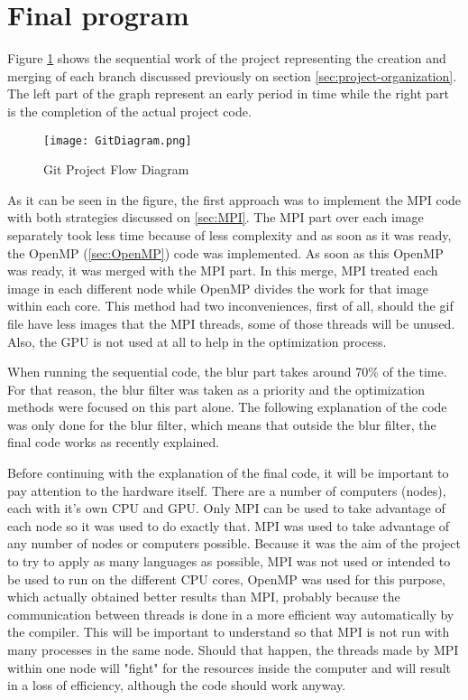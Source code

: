 \documentclass[conference,compsoc]{IEEEtran}
\begin{document}

\section{Final program}

Figure \ref{fig:Git-Project-Flow-Diagram} shows the sequential work of the project representing the creation and merging of each branch discussed previously on section \ref{sec:project-organization}. The left part of the graph represent an early period in time while the right part is the completion of the actual project code.

\begin{figure}[H]
	\texttt{[image: GitDiagram.png]}	\centering
	\caption{Git Project Flow Diagram	\label{fig:Git-Project-Flow-Diagram}}
\end{figure}

As it can be seen in the figure, the first approach was to implement the MPI code with both strategies discussed on \ref{sec:MPI}. The MPI part over each image separately took less time because of less complexity and as soon as it was ready, the OpenMP (\ref{sec:OpenMP}) code was implemented. As soon as this OpenMP was ready, it was merged with the MPI part. In this merge, MPI treated each image in each different node while OpenMP divides the work for that image within each core. This method had two inconveniences, first of all, should the gif file have less images that the MPI threads, some of those threads will be unused. Also, the GPU is not used at all to help in the optimization process.

When running the sequential code, the blur part takes around 70\% of the time. For that reason, the blur filter was taken as a priority and the optimization methods were focused on this part alone. The following explanation of the code was only done for the blur filter, which means that outside the blur filter, the final code works as recently explained.

Before continuing with the explanation of the final code, it will be important to pay attention to the hardware itself. There are a number of computers (nodes), each with it's own CPU and GPU. Only MPI can be used to take advantage of each node so it was used to do exactly that. MPI was used to take advantage of any number of nodes or computers possible. Because it was the aim of the project to try to apply as many languages as possible, MPI was not used or intended to be used to run on the different CPU cores, OpenMP was used for this purpose, which actually obtained better results than MPI, probably because the communication between threads is done in a more efficient way automatically by the compiler. This will be important to understand so that MPI is not run with many processes in the same node. Should that happen, the threads made by MPI within one node will "fight" for the resources inside the computer and will result in a loss of efficiency, although the code should work anyway.
\end{document}
